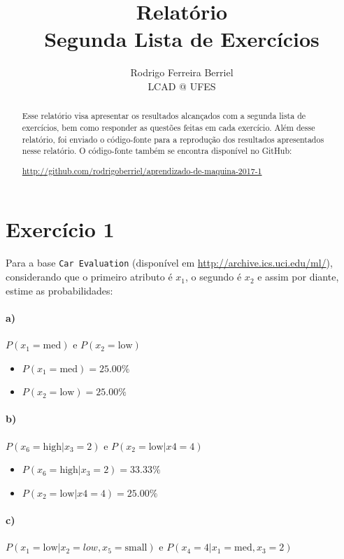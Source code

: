 \documentclass{article}
\title{Relatório\\Segunda Lista de Exercícios}
\author{
  Rodrigo Ferreira Berriel\\
  LCAD @ UFES
}
\begin{document}
\maketitle

\begin{abstract}
  Esse relatório visa apresentar os resultados alcançados com a segunda lista de exercícios, bem como responder as questões feitas em cada exercício. Além desse relatório, foi enviado o código-fonte para a reprodução dos resultados apresentados nesse relatório. O código-fonte também se encontra disponível no GitHub:
  
  \url{http://github.com/rodrigoberriel/aprendizado-de-maquina-2017-1}
\end{abstract}

\section{Exercício 1}

Para a base \texttt{Car Evaluation} (disponível em \url{http://archive.ics.uci.edu/ml/}), considerando que o primeiro atributo é $x_1$, o segundo é $x_2$ e assim por diante, estime as probabilidades:

\paragraph{a)} $P(x_1=\text{med})$ e $P(x_2=\text{low})$

\begin{itemize}
	\item $P(x_1=\text{med}) = 25.00\%$
	\item $P(x_2=\text{low}) = 25.00\%$
\end{itemize}

\paragraph{b)} $P(x_6=\text{high} | x_3=2)$ e $P(x_2=\text{low} | x4=4)$

\begin{itemize}
	\item $P(x_6=\text{high} | x_3=2) = 33.33\%$
	\item $P(x_2=\text{low} | x4=4) = 25.00\%$
\end{itemize}

\paragraph{c)} $P(x_1=\text{low}|x_2=low,x_5=\text{small})$ e $P(x_4=4|x_1=\text{med},x_3=2)$
\end{document}
